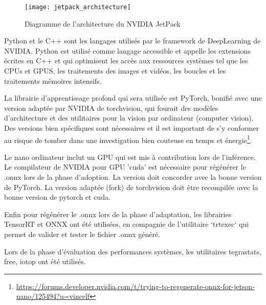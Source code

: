 \begin{figure}[H]
    \centering
    \texttt{[image: jetpack\_architecture]}
    \caption[Diagramme de l'architecture du NVIDIA JetPack]{Diagramme de l'architecture du NVIDIA JetPack\protect\footnotemark}
    \label{fig:jetpack_architecture}
\end{figure}
\par Python et le C++ sont les langages utilisés par le framework de DeepLearning de NVIDIA. Python est utilisé comme langage accessible et appelle les extensions écrites en C++ et qui optimisent les accès aux ressources systèmes tel que les CPUs et GPUS, les traitements des images et vidéos, les boucles et les traitements mémoires intensifs.
\par La librairie d’apprentissage profond qui sera utilisée est PyTorch, bonifié avec une version adaptée par NVIDIA de torchvision, qui fournit des modèles d'architecture et des utilitaires pour la vision par ordinateur (computer vision). Des versions bien spécifiques sont nécessaires et il est important de s'y conformer au risque de tomber dans une investigation bien couteuse en temps et énergie\footnote{\url{https://forums.developer.nvidia.com/t/trying-to-regenerate-onnx-for-jetson-nano/125494?u=vincelf}}.
\par Le nano ordinateur inclut un GPU qui est mis à contribution lors de l'inférence. Le compilateur de NVIDIA pour GPU 'cuda' est nécessaire pour régénérer le .onnx lors de la phase d'adoption. La version doit concorder avec la bonne version de PyTorch. La version adaptée (fork) de torchvision doit être recompilée avec la bonne version de pytorch et cuda. 
\par Enfin pour régénérer le .onnx lors de la phase d'adaptation, les librairies TensorRT et ONNX ont été utilisées, en compagnie de l'utilitaire `trtexec` qui permet de valider et tester le fichier .onnx généré.
\par Lors de la phase d'évaluation des performances systèmes, les utilitaires tegrastats, free, iotop ont été utilisés.
